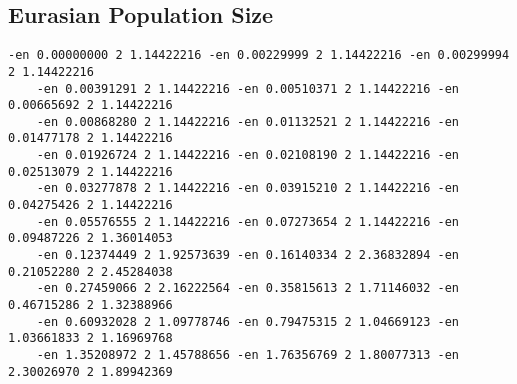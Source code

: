 \subsection{Eurasian Population Size}

\begin{Verbatim}[fontsize=\tiny]
    -en 0.00000000 2 1.14422216 -en 0.00229999 2 1.14422216 -en 0.00299994 2 1.14422216
    -en 0.00391291 2 1.14422216 -en 0.00510371 2 1.14422216 -en 0.00665692 2 1.14422216
    -en 0.00868280 2 1.14422216 -en 0.01132521 2 1.14422216 -en 0.01477178 2 1.14422216
    -en 0.01926724 2 1.14422216 -en 0.02108190 2 1.14422216 -en 0.02513079 2 1.14422216
    -en 0.03277878 2 1.14422216 -en 0.03915210 2 1.14422216 -en 0.04275426 2 1.14422216
    -en 0.05576555 2 1.14422216 -en 0.07273654 2 1.14422216 -en 0.09487226 2 1.36014053
    -en 0.12374449 2 1.92573639 -en 0.16140334 2 2.36832894 -en 0.21052280 2 2.45284038 
    -en 0.27459066 2 2.16222564 -en 0.35815613 2 1.71146032 -en 0.46715286 2 1.32388966
    -en 0.60932028 2 1.09778746 -en 0.79475315 2 1.04669123 -en 1.03661833 2 1.16969768
    -en 1.35208972 2 1.45788656 -en 1.76356769 2 1.80077313 -en 2.30026970 2 1.89942369
\end{Verbatim}

